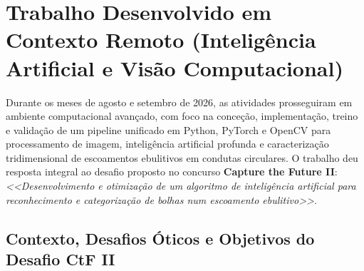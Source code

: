 \section{Trabalho Desenvolvido em Contexto Remoto (Inteligência Artificial e Visão Computacional)}
\label{sec:computacional_ia}

Durante os meses de agosto e setembro de 2026, as atividades prosseguiram em ambiente computacional avançado, com foco na conceção, implementação, treino e validação de um pipeline unificado em Python, PyTorch e OpenCV para processamento de imagem, inteligência artificial profunda e caracterização tridimensional de escoamentos ebulitivos em condutas circulares. O trabalho deu resposta integral ao desafio proposto no concurso \textbf{Capture the Future II}: \emph{<<Desenvolvimento e otimização de um algoritmo de inteligência artificial para reconhecimento e categorização de bolhas num escoamento ebulitivo>>}.

\subsection{Contexto, Desafios Óticos e Objetivos do Desafio CtF II}
\label{subsec:contexto_ia}

